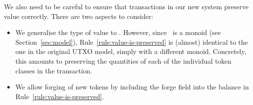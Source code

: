We also need to be careful to ensure that transactions in our new system preserve value correctly.
There are two aspects to consider:
\begin{itemize}
\item
  We generalise the type of value to \Quantities.
  However, since \Quantities\ is a monoid (see Section~\ref{sec:model}), Rule~\ref{rule:value-is-preserved} is (almost) identical to the one in the original UTXO model, simply with a different monoid.
  Concretely, this amounts to preserving the quantities of each of the individual token classes in the transaction.
\item
  We allow forging of new tokens by including the forge field into the balance in Rule~\ref{rule:value-is-preserved}.
\end{itemize}
